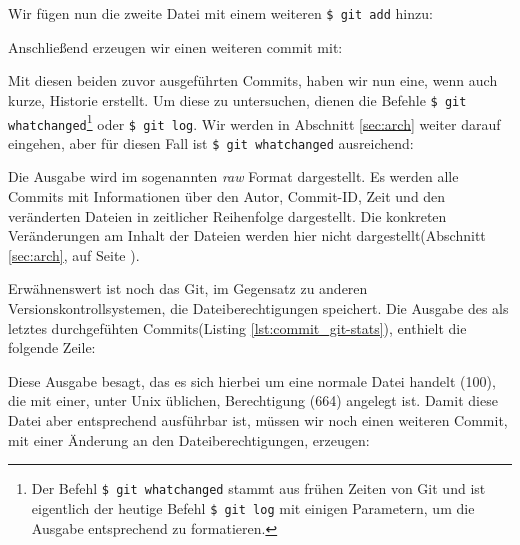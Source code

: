 Wir fügen nun die zweite Datei mit einem weiteren \texttt{\$ git add} hinzu:



Anschließend erzeugen wir einen weiteren \gls{commit} mit:



Mit diesen beiden zuvor ausgeführten Commits, haben wir nun eine, wenn auch
kurze, Historie erstellt. Um diese zu untersuchen, dienen die Befehle
\texttt{\$ git whatchanged}\footnote{Der Befehl \texttt{\$ git whatchanged}
stammt aus frühen Zeiten von Git und ist eigentlich der heutige Befehl
\texttt{\$ git log} mit einigen Parametern, um die Ausgabe entsprechend zu
formatieren.} oder \texttt{\$ git log}. Wir werden in Abschnitt \ref{sec:arch}
weiter darauf eingehen, aber für diesen Fall ist \texttt{\$ git whatchanged}
ausreichend:



Die Ausgabe wird im sogenannten \textit{raw} Format dargestellt. Es werden alle
Commits mit Informationen über den Autor, Commit-ID, Zeit und den veränderten
Dateien in zeitlicher Reihenfolge dargestellt. Die konkreten Veränderungen am
Inhalt der Dateien werden hier nicht dargestellt(Abschnitt \ref{sec:arch}, auf
Seite \pageref{sec:arch}).

Erwähnenswert ist noch das Git, im Gegensatz zu anderen
Versionskontrollsystemen, die Dateiberechtigungen speichert. Die Ausgabe des
als letztes durchgefühten Commits(Listing \ref{lst:commit_git-stats}), enthielt
die folgende Zeile:



Diese Ausgabe besagt, das es sich hierbei um eine normale Datei handelt (100),
die mit einer, unter Unix üblichen, Berechtigung (664) angelegt ist. Damit
diese Datei aber entsprechend ausführbar ist, müssen wir noch einen weiteren
Commit, mit einer Änderung an den Dateiberechtigungen, erzeugen:



